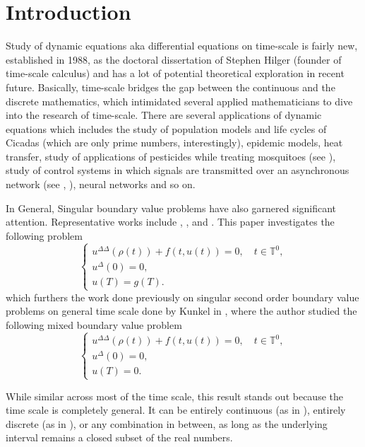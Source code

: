 \documentclass[12pt,reqno]{amsart}
\begin{document}
\section{Introduction}
Study of dynamic equations aka differential equations on time-scale is fairly new, established in 1988, as the doctoral dissertation of Stephen Hilger (founder of time-scale calculus) and has a lot of potential theoretical exploration in recent future. Basically, time-scale bridges the gap between the continuous and the discrete mathematics, which intimidated several applied mathematicians to dive into the research of time-scale.  There are several applications of dynamic equations which includes the study of population models and life cycles of Cicadas (which are only prime numbers, interestingly), epidemic models, heat transfer, study of applications of pesticides while treating mosquitoes (see \cite{thomas2009}), study of control systems in which signals are transmitted over an asynchronous network (see \cite{kozyakin2004}, \cite{siegmund2021}), neural networks and so on.\\
\par In General, Singular boundary value problems have also garnered significant attention.  Representative works include \cite{agarwal1999}, \cite{precup2016}, and \cite{rachunkova2009}.
This paper investigates the following problem
\begin{equation}
\begin{cases}
u^{\Delta\Delta}(\rho(t)) + f(t, u(t)) = 0, \quad t \in \mathbb{T}^0,\\
u^{\Delta}(0) = 0, \\
u(T) = g(T).
\end{cases}
\end{equation}
which furthers the work done previously on singular second order boundary value problems on general time scale done by Kunkel in \cite{kunkel2019} , where the author studied the following mixed boundary value problem
\begin{equation}
\begin{cases}
u^{\Delta\Delta}(\rho(t)) + f(t, u(t)) = 0, \quad t \in \mathbb{T}^0,\\
u^{\Delta}(0) = 0, \\
u(T) = 0.
\end{cases}
\end{equation}

While similar across most of the time scale, this result stands out because the time scale is completely general. It can be entirely continuous (as in \cite{kunkel2006}), entirely discrete (as in \cite{kunkel2008}), or any combination in between, as long as the underlying interval remains a closed subset of the real numbers.
\end{document}
